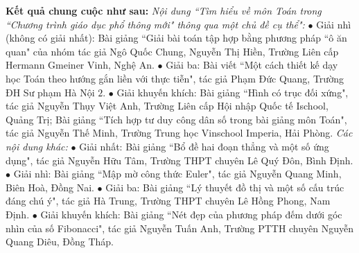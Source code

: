 \begin{multicols}{2}
%	
	\vskip 0.1cm
	\textbf{\color{diendantoanhoc}Kết quả chung cuộc như sau:}
	\vskip 0.1cm
	\textit{Nội dung ``Tìm hiểu về môn Toán trong ``Chương trình giáo dục phổ thông mới" thông qua một chủ đề cụ thể": }
	\vskip 0.1cm
	$\bullet$	Giải nhì (không có giải nhất): Bài giảng ``Giải bài toán tập hợp bằng phương pháp ``ô ăn quan" của nhóm tác giả Ngô Quốc Chung, Nguyễn Thị Hiền, Trường Liên cấp Hermann Gmeiner Vinh, Nghệ An. 
	\vskip 0.1cm
	$\bullet$	Giải ba: Bài viết ``Một cách thiết kế dạy học Toán theo hướng gắn liền với thực tiễn", tác giả Phạm Đức Quang, Trường ĐH Sư phạm Hà Nội $2$.
	\vskip 0.1cm 
	$\bullet$	Giải khuyến khích: Bài giảng ``Hình có trục đối xứng", tác giả Nguyễn Thụy Việt Anh, Trường Liên cấp Hội nhập Quốc tế Ischool, Quảng Trị; Bài giảng ``Tích hợp tư duy công dân số trong bài giảng môn Toán", tác giả Nguyễn Thế Minh, Trường Trung học Vinschool Imperia, Hải Phòng.
	\vskip 0.1cm
	\textit{Các nội dung khác:}
	\vskip 0.1cm 
	$\bullet$	Giải nhất: Bài giảng ``Bổ đề hai đoạn thẳng và một số ứng dụng", tác giả Nguyễn Hữu Tâm, Trường THPT chuyên Lê Quý Đôn, Bình Định. 
	\vskip 0.1cm
	$\bullet$	Giải nhì: Bài giảng ``Mập mờ công thức Euler", tác giả Nguyễn Quang Minh, Biên Hoà, Đồng Nai. 
	\vskip 0.1cm
	$\bullet$	Giải ba: Bài giảng ``Lý thuyết đồ thị và một số cấu trúc đáng chú ý", tác giả Hà Trung, Trường THPT chuyên Lê Hồng Phong, Nam Định. 
	\vskip 0.1cm
	$\bullet$	Giải khuyến khích: Bài giảng ``Nét đẹp của phương pháp đếm dưới góc nhìn của số Fibonacci", tác giả Nguyễn Tuấn Anh, Trường PTTH chuyên Nguyễn Quang Diêu, Đồng Tháp. 
\end{multicols}